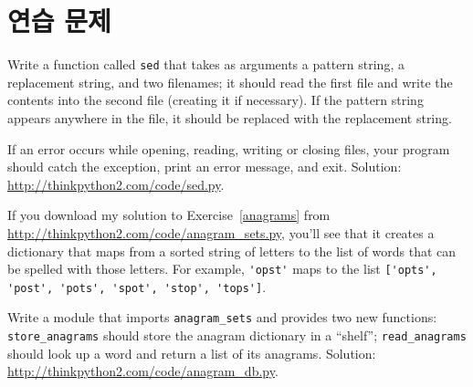 \documentclass[10pt]{book}
\begin{document}
\section{연습 문제}

\begin{exercise}

Write a function called {\tt sed} that takes as arguments a pattern string,
a replacement string, and two filenames; it should read the first file
and write the contents into the second file (creating it if
necessary).  If the pattern string appears anywhere in the file, it
should be replaced with the replacement string.

If an error occurs while opening, reading, writing or closing files,
your program should catch the exception, print an error message, and
exit.  Solution: \url{http://thinkpython2.com/code/sed.py}.

\end{exercise}


\begin{exercise}

If you download my solution to Exercise~\ref{anagrams} from
\url{http://thinkpython2.com/code/anagram_sets.py}, you'll see that it creates
a dictionary that maps from a sorted string of letters to the list of
words that can be spelled with those letters.  For example,
\verb"'opst'" maps to the list
\verb"['opts', 'post', 'pots', 'spot', 'stop', 'tops']".

Write a module that imports \verb"anagram_sets" and provides
two new functions: \verb"store_anagrams" should store the
anagram dictionary in a ``shelf''; \verb"read_anagrams" should
look up a word and return a list of its anagrams.
Solution: \url{http://thinkpython2.com/code/anagram_db.py}.

\end{exercise}
\end{document}
